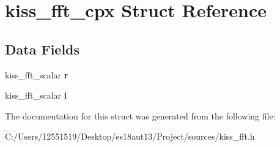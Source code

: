 \hypertarget{structkiss__fft__cpx}{}\section{kiss\+\_\+fft\+\_\+cpx Struct Reference}
\label{structkiss__fft__cpx}
\subsection*{Data Fields}
\begin{DoxyCompactItemize}
\item 
\hypertarget{structkiss__fft__cpx_a686b6187e3e885de316908319c71ea8f}{}kiss\+\_\+fft\+\_\+scalar {\bfseries r}\label{structkiss__fft__cpx_a686b6187e3e885de316908319c71ea8f}

\item 
\hypertarget{structkiss__fft__cpx_ac1e17add2ae6b815da29d7d67b03fa70}{}kiss\+\_\+fft\+\_\+scalar {\bfseries i}\label{structkiss__fft__cpx_ac1e17add2ae6b815da29d7d67b03fa70}

\end{DoxyCompactItemize}


The documentation for this struct was generated from the following file\+:\begin{DoxyCompactItemize}
\item 
C\+:/\+Users/12551519/\+Desktop/es18aut13/\+Project/sources/kiss\+\_\+fft.\+h\end{DoxyCompactItemize}
